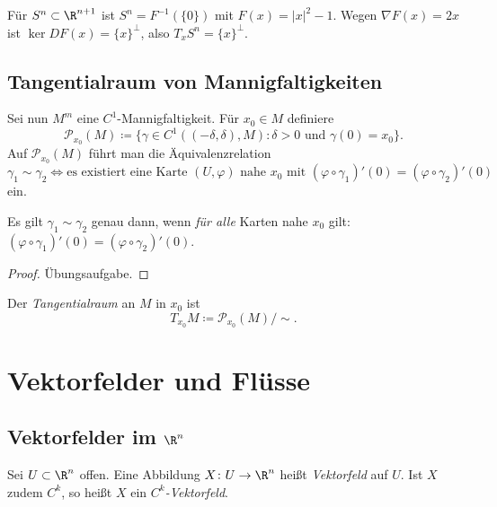 \documentclass[11pt]{article}
\begin{document}
\begin{example}
  Für $S^n \subset \R^{n+1}$ ist $S^n = F^{-1}(\{0\})$ mit $F(x) = \lvert x \rvert^2 - 1$. Wegen $\nabla F(x) = 2x$ ist $\ker DF(x) = \{x\}^\perp$, also $T_x S^n = \{x\}^\perp$.
\end{example}


\subsection{Tangentialraum von Mannigfaltigkeiten}

Sei nun $M^m$ eine $C^1$-Mannigfaltigkeit. Für $x_0 \in M$ definiere
\[ \mathcal{P}_{x_0}(M) \coloneqq \bigl\{ \gamma \in C^1((-\delta, \delta), M) : \delta > 0 \text{ und } \gamma(0) = x_0 \bigr\}. \]
Auf $\mathcal{P}_{x_0}(M)$ führt man die Äquivalenzrelation
\[ \gamma_1 \sim \gamma_2 \iff \text{es existiert eine Karte } (U, \varphi) \text{ nahe } x_0 \text{ mit } (\varphi \circ \gamma_1)'(0) = (\varphi \circ \gamma_2)'(0) \]
ein.


\begin{note}
  Es gilt $\gamma_1 \sim \gamma_2$ genau dann, wenn \textit{für alle} Karten nahe $x_0$ gilt: $(\varphi \circ \gamma_1)'(0) = (\varphi \circ \gamma_2)'(0)$.
\end{note}


\begin{proof}
  Übungsaufgabe.
\end{proof}

\begin{definition}[Tangentialraum]\Theorem
  Der \emph{Tangentialraum} an $M$ in $x_0$ ist
  \[ T_{x_0} M \coloneqq \mathcal{P}_{x_0}(M) / {\sim}. \]
\end{definition}


\section{Vektorfelder und Flüsse}

\subsection{Vektorfelder im \texorpdfstring{$\R^n$}{Rn}}

\begin{definition}[Vektorfeld]\Theorem
  Sei $U \subset \R^n$ offen. Eine Abbildung $X\colon U \to \R^n$ heißt \emph{Vektorfeld} auf $U$. Ist $X$ zudem $C^k$, so heißt $X$ ein \emph{$C^k$-Vektorfeld}.
\end{definition}
\end{document}
